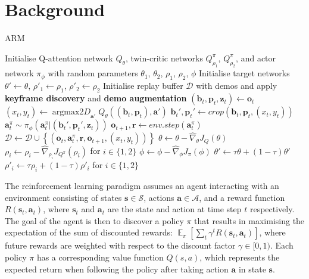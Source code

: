 \documentclass[letterpaper, 10 pt, journal, twoside]{IEEEtran}
\newcommand{\bs}{\mathbf{s}}
\newcommand{\ba}{\mathbf{a}}
\newcommand{\br}{\mathbf{r}}
\newcommand{\st}{\bs_t}
\newcommand{\at}{\ba_t}
\newcommand{\aNbpt}{\at^\pi}
\newcommand{\states}{\mathcal{S}}
\newcommand{\actions}{\mathcal{A}}
\newcommand{\qattn}{Q}
\newcommand{\qcritic}{Q^{\pi}}
\newcommand{\qattnp}{\theta}
\newcommand{\qcriticp}{\rho}
\newcommand{\pip}{\phi}
\newcommand{\obs}{\mathbf{o}}
\newcommand{\rgb}{\mathbf{b}}
\newcommand{\pcd}{\mathbf{p}}
\newcommand{\proprio}{\mathbf{z}}
\newcommand{\replay}{\mathcal{D}}
\DeclareMathOperator*{\E}{\mathbb{E}}
\DeclareMathOperator*{\argmaxtwod}{argmax\textit{2D}}
\begin{document}
\section{Background}

\begin{algorithm*}[tb]
\caption{ARM}
\label{alg:arm}
\begin{algorithmic}
    \State Initialise Q-attention network $\qattn_{\qattnp}$, twin-critic networks $\qcritic_{\qcriticp_1}$, $\qcritic_{\qcriticp_2}$, and actor network $\pi_\pip$ with random parameters $\qattnp_1$, $\qattnp_2$, $\qcriticp_1$, $\qcriticp_2$, $\pip$
    \State Initialise target networks $\qattnp' \leftarrow \qattnp$, $\qcriticp'_1 \leftarrow \qcriticp_1$, $\qcriticp'_2 \leftarrow \qcriticp_2$
    \State Initialise replay buffer $\replay$ with demos and apply \textbf{keyframe discovery} and \textbf{demo augmentation}
	        \State $(\rgb_t, \pcd_t, \proprio_t) \leftarrow \obs_t$
	        \State $(x_t, y_t) \leftarrow \argmaxtwod_{\ba'} \qattn_{\qattnp}((\rgb_t, \pcd_t), \ba')$ 
	        \State $\rgb_t', \pcd_t' \leftarrow crop(\rgb_t, \pcd_t, (x_t, y_t))$
	        \State $\aNbpt \sim \pi_\pip(\aNbpt|(\rgb_t', \pcd_t', \proprio_t))$ 
	        \State $\obs_{t+1}, \br \leftarrow env.step(\aNbpt)$  
	        \State $\mathcal{D} \leftarrow \replay \cup \left\{(\obs_t, \aNbpt, \br, \obs_{t+1}, (x_t, y_t))\right\}$ 
	    \EndFor
    	    \State $\qattnp \leftarrow \qattnp - \hat \nabla_{\qattnp} J_{\qattn}(\qattnp)$ 
    	    \State $\qcriticp_i \leftarrow \qcriticp_i -  \hat \nabla_{\qcriticp_i} J_{\qcritic}(\qcriticp_i)$ for $i\in\{1, 2\}$ 
    	    \State $\pip \leftarrow \pip -  \hat \nabla_\pip J_\pi(\pip)$ 
    	    \State $\qattnp' \leftarrow \tau \qattnp + (1-\tau) \qattnp'$ 
    	    \State $\qcriticp'_i \leftarrow \tau \qcriticp_i + (1-\tau) \qcriticp'_i$ for $i\in\{1,2\}$ 
    	\EndFor
    \EndFor
\end{algorithmic}
\end{algorithm*}

The reinforcement learning paradigm assumes an agent interacting with an environment consisting of states $\bs \in \states$, actions $\ba \in \actions$, and a reward function $R(\st,\at)$, where $\st$ and $\at$ are the state and action at time step $t$ respectively. The goal of the agent is then to discover a policy $\pi$ that results in maximising the expectation of the sum of discounted rewards: $\E_\pi [\sum_t \gamma^t R(\st, \at)]$, where future rewards are weighted with respect to the discount factor $\gamma \in [0, 1)$. Each policy $\pi$ has a corresponding value function $Q(s, a)$, which represents the expected return when following the policy after taking action $\ba$ in state $\bs$.
\end{document}
